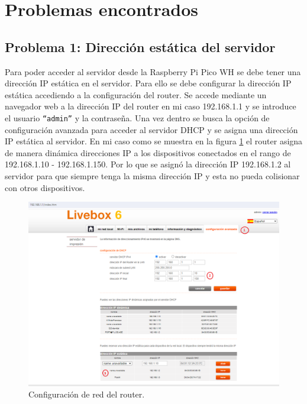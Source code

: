 \documentclass{article}
\begin{document}
\section{Problemas encontrados}
\subsection{Problema 1: Dirección estática del servidor} 
Para poder acceder al servidor desde la Raspberry Pi Pico WH se debe tener una dirección IP estática en el servidor. Para ello se debe configurar la dirección IP estática accediendo a la configuración del router.
Se accede mediante un navegador web a la dirección IP del router en mi caso 192.168.1.1 y se introduce el usuario \texttt{``admin''} y la contraseña. Una vez dentro se busca la opción de configuración avanzada para acceder al servidor DHCP y se asigna una dirección IP estática al servidor.
En mi caso como se muestra en la figura \ref{fig:configuracion router} el router asigna de manera dinámica direcciones IP a los dispositivos conectados en el rango de 192.168.1.10 - 192.168.1.150. Por lo que se asignó la dirección IP 192.168.1.2 al servidor para que siempre tenga la misma dirección IP y esta no pueda colisionar con otros dispositivos.
\begin{figure}[H]
	\raggedright
	\includegraphics[width=1\linewidth]{../images/router_config.png}
	\caption{\label{fig:configuracion router}Configuración de red del router.}
\end{figure}
\end{document}
